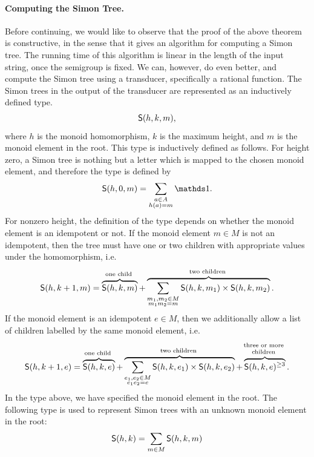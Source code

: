\paragraph*{Computing the Simon Tree.} Before continuing, we would like to observe that the proof of the above theorem is constructive, in the sense that it gives an algorithm for computing a Simon tree. The running time of this algorithm is linear in the length of the input string, once the semigroup is fixed.  We can, however, do even better, and compute the Simon tree using a transducer, specifically a rational function. The Simon trees in the output of the transducer are represented as an inductively defined type. 
\begin{align*}
    \mathsf S(h,k,m),
\end{align*}
where $h$ is the monoid homomorphism, $k$ is the maximum height, and $m$ is the monoid element in the root.  This type is inductively defined as follows. For height  zero, a Simon  tree is nothing but a letter which is mapped to the chosen monoid element, and therefore the type is defined by 
\begin{align*}
\facttype {h,0,m} = \sum_{
    \substack{
        a \in A \\
        h(a) = m
    }
} \onetype.
\end{align*}
For nonzero height, the definition of the type depends on whether the monoid element is an idempotent or not. If the  monoid element $m \in M$ is not an idempotent, then the  tree must have one or two children with appropriate values under the homomorphism, i.e.~
\begin{align*}
\facttype {h,k+1, m} = 
\myoverbrace{\facttype {h,k,m}}{one child} +  
\myoverbrace{
\sum_{
    \substack{
        m_1,m_2 \in M \\
        m_1m_2 = m
    }    
} \facttype {h,k,m_1} \times \facttype {h,k,m_2}}
{two children}.
\end{align*}
If the monoid element    is an idempotent $e \in M$, then we additionally allow a list of children labelled by the same monoid element, i.e.
\begin{align*}
\facttype {h,k+1, e} = 
\myoverbrace{\facttype {h,k,e}}{one child} +  
\myoverbrace{
\sum_{
    \substack{
        e_1,e_2 \in M \\
        e_1e_2 = e
    }    
} \facttype {h,k,e_1} \times \facttype {h,k,e_2}}
{two children}
+ 
\myoverbrace{
    \facttype{h,k,e}^{\ge 3}}{three or more\\  children}.
\end{align*}
In the type above, we have specified the monoid element in the root. The following type is 
used to represent Simon trees with an unknown monoid element in the root:
\begin{align*}
\mathsf S(h,k) = \sum_{m \in M} \mathsf S(h,k,m)
\end{align*}

